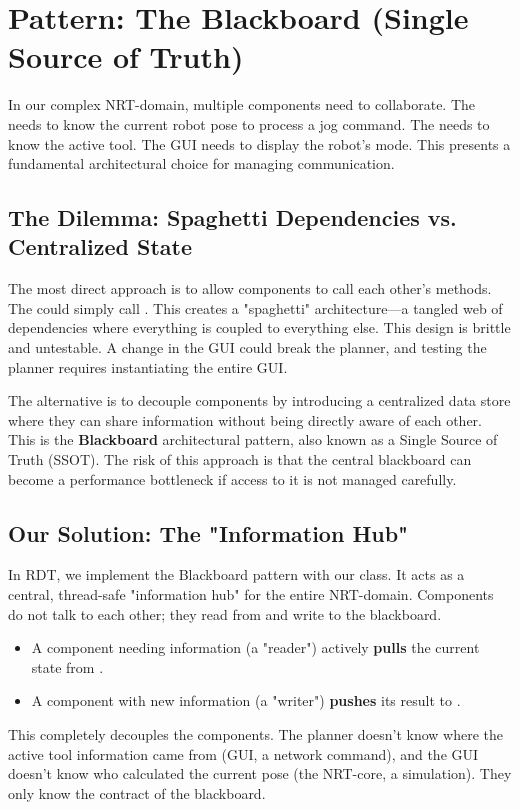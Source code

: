 \section{Pattern: The Blackboard (Single Source of Truth)}
\label{sec:pattern_blackboard_conceptual}

In our complex NRT-domain, multiple components need to collaborate. The  needs to know the current robot pose to process a jog command. The  needs to know the active tool. The GUI needs to display the robot's mode. This presents a fundamental architectural choice for managing communication.

\subsection{The Dilemma: Spaghetti Dependencies vs. Centralized State}
\label{subsec:spaghetti_vs_centralized}

The most direct approach is to allow components to call each other's methods. The  could simply call . This creates a "spaghetti" architecture—a tangled web of dependencies where everything is coupled to everything else. This design is brittle and untestable. A change in the GUI could break the planner, and testing the planner requires instantiating the entire GUI.

The alternative is to decouple components by introducing a centralized data store where they can share information without being directly aware of each other. This is the \textbf{Blackboard} architectural pattern, also known as a Single Source of Truth (SSOT). The risk of this approach is that the central blackboard can become a performance bottleneck if access to it is not managed carefully.

\subsection{Our Solution: The  "Information Hub"}
\label{subsec:statedata_solution}

In RDT, we implement the Blackboard pattern with our \textbf{} class. It acts as a central, thread-safe "information hub" for the entire NRT-domain. Components do not talk to each other; they read from and write to the blackboard.
\begin{itemize}
    \item A component needing information (a "reader") actively \textbf{pulls} the current state from .
    \item A component with new information (a "writer") \textbf{pushes} its result to .
\end{itemize}
This completely decouples the components. The planner doesn't know where the active tool information came from (GUI, a network command), and the GUI doesn't know who calculated the current pose (the NRT-core, a simulation). They only know the contract of the  blackboard.

